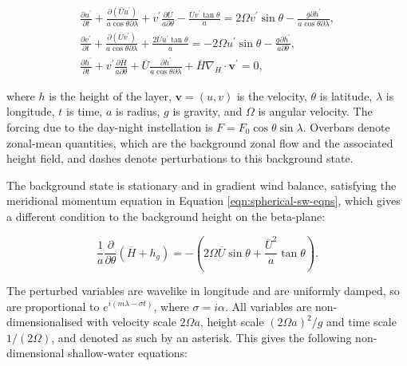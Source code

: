\begin{equation}\label{eqn:spherical-sw-eqns}
  \begin{aligned}
    {\frac{\partial u^{\prime}}{\partial t}+\frac{\partial\left(\overline{U} u^{\prime}\right)}{a \cos \theta \partial \lambda}+v^{\prime} \frac{\partial \overline{U}}{a \partial \theta}-\frac{\overline{U} v^{\prime} \tan \theta}{a}=2 \Omega v^{\prime} \sin \theta-\frac{g \partial h^{\prime}}{a \cos \theta \partial \lambda}}, \\
     {\frac{\partial v^{\prime}}{\partial t}+\frac{\partial\left(\overline{U} v^{\prime}\right)}{a \cos \theta \partial \lambda}+\frac{2 \overline{U} u^{\prime} \tan \theta}{a}=-2 \Omega u^{\prime} \sin \theta-\frac{g \partial h^{\prime}}{a \partial \theta}}, \\
     {\frac{\partial h^{\prime}}{\partial t}+v^{\prime} \frac{\partial \overline{H}}{a \partial \theta}+\overline{U} \frac{\partial h^{\prime}}{a \cos \theta \partial \lambda}+\overline{H} \nabla_{H} \cdot \mathbf{v}^{\prime}=0},
  \end{aligned}
\end{equation}

where $h$ is the height of the layer, $\boldsymbol{v} = (u,v)$ is the velocity, $\theta$ is latitude, $\lambda$ is longitude, $t$ is time, $a$ is radius, $g$ is gravity, and $\Omega$ is angular velocity. The forcing due to the day-night instellation is $F = F_{0} \cos \theta \sin \lambda$. Overbars denote zonal-mean quantities, which are the background zonal flow and the associated height field, and dashes denote perturbations to this background state.

The background state is stationary and in gradient wind balance, satisfying the meridional momentum equation in Equation \ref{eqn:spherical-sw-eqns}, which gives a different condition to the background height on the beta-plane:

\begin{equation}\label{eqn:gradient-wind-balance}
  \frac{1}{a} \frac{\partial}{\partial \theta}\left(\overline{H}+h_{g}\right)=-\left(2 \Omega \overline{U} \sin \theta+\frac{\overline{U}^{2}}{a} \tan \theta\right).
\end{equation}

The perturbed variables are wavelike in longitude and are uniformly damped, so are proportional to $e ^{i (m \lambda-\sigma t)}$, where $\sigma = i \alpha$. All variables are non-dimensionalised with velocity scale $2 \Omega a$, height scale $(2 \Omega a)^{2}/g$ and time scale $1/(2\Omega)$, and denoted as such by an asterisk. This gives the following non-dimensional shallow-water equations:

